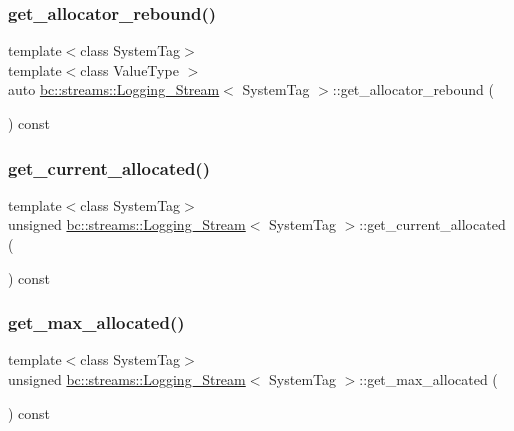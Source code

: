 \subsubsection{\texorpdfstring{get\+\_\+allocator\+\_\+rebound()}{get\_allocator\_rebound()}}
{\footnotesize\ttfamily template$<$class System\+Tag$>$ \\
template$<$class Value\+Type $>$ \\
auto \hyperlink{structbc_1_1streams_1_1Logging__Stream}{bc\+::streams\+::\+Logging\+\_\+\+Stream}$<$ System\+Tag $>$\+::get\+\_\+allocator\+\_\+rebound (\begin{DoxyParamCaption}{ }\end{DoxyParamCaption}) const\hspace{0.3cm}{\ttfamily [inline]}}

\mbox{\label{structbc_1_1streams_1_1Logging__Stream_a14436a0b3b7dd144a57260ce98e8fdaf}} 
\subsubsection{\texorpdfstring{get\+\_\+current\+\_\+allocated()}{get\_current\_allocated()}}
{\footnotesize\ttfamily template$<$class System\+Tag$>$ \\
unsigned \hyperlink{structbc_1_1streams_1_1Logging__Stream}{bc\+::streams\+::\+Logging\+\_\+\+Stream}$<$ System\+Tag $>$\+::get\+\_\+current\+\_\+allocated (\begin{DoxyParamCaption}{ }\end{DoxyParamCaption}) const\hspace{0.3cm}{\ttfamily [inline]}}

\mbox{\label{structbc_1_1streams_1_1Logging__Stream_ab810973b3205fccd805f8a96b7245fa0}} 
\subsubsection{\texorpdfstring{get\+\_\+max\+\_\+allocated()}{get\_max\_allocated()}}
{\footnotesize\ttfamily template$<$class System\+Tag$>$ \\
unsigned \hyperlink{structbc_1_1streams_1_1Logging__Stream}{bc\+::streams\+::\+Logging\+\_\+\+Stream}$<$ System\+Tag $>$\+::get\+\_\+max\+\_\+allocated (\begin{DoxyParamCaption}{ }\end{DoxyParamCaption}) const\hspace{0.3cm}{\ttfamily [inline]}}

